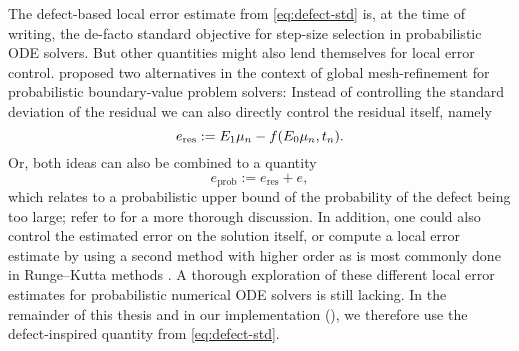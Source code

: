 \documentclass{mimosis}
\begin{document}
\begin{remark}
The defect-based local error estimate from \cref{eq:defect-std} is, at the time of writing, the de-facto standard objective for step-size selection in probabilistic ODE solvers.
But other quantities might also lend themselves for local error control.
\textcite{kraemer202bvp} proposed two alternatives in the context of global mesh-refinement for probabilistic boundary-value problem solvers:
Instead of controlling the standard deviation of the residual we can also directly control the residual itself, namely
\begin{equation}
   e_\text{res} := \proj{1}\mu_n - \vf(\proj{0}\mu_n, t_n).
\end{equation}
Or, both ideas can also be combined to a quantity
\begin{equation}
   e_\text{prob} := e_\text{res} + e,
\end{equation}
which relates to a probabilistic upper bound of the probability of the defect being too large; refer to \textcite{kraemer202bvp} for a more thorough discussion.
In addition, one could also control the estimated error on the solution itself, or compute a local error estimate by using a second method with higher order as is most commonly done in Runge--Kutta methods
\parencite[Chapter II.4]{hairer2008solving}.
A thorough exploration of these different local error estimates for probabilistic numerical ODE solvers is still lacking.
In the remainder of this thesis and in our implementation (\joss{}), we therefore use the defect-inspired quantity from \cref{eq:defect-std}.
\end{remark}
\end{document}
